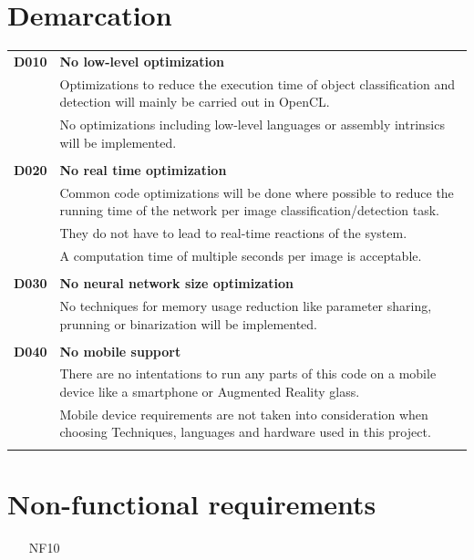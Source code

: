 \documentclass[parskip=full]{scrartcl}
\begin{document}
\section{Demarcation}
\begin{tabular}{p{2cm}p{12cm}}
\textbf{D010} & \textbf{No low-level optimization}\\
& Optimizations to reduce the execution time of object classification and detection will mainly be carried out in OpenCL.\\
& No optimizations including low-level languages or assembly intrinsics will be implemented.\\
&\\
\textbf{D020} & \textbf{No real time optimization}\\
& Common code optimizations will be done where possible to reduce the running time of the network per image classification/detection task.\\
& They do not have to lead to real-time reactions of the system.\\
& A computation time of multiple seconds per image is acceptable.\\
&\\
\textbf{D030} & \textbf{No neural network size optimization}\\
&No techniques for memory usage reduction like parameter sharing, prunning or binarization will be implemented.\\
&\\
\textbf{D040} & \textbf{No mobile support}\\
& There are no intentations to run any parts of this code on a mobile device like a smartphone or Augmented Reality glass.\\
& Mobile device requirements are not taken into consideration when choosing Techniques, languages and hardware used in this project. \\
&\\
\end{tabular}

\section{Non-functional requirements}
\begin{itemize}[nosep]
\item[NF10] 
\end{itemize}
\end{document}
